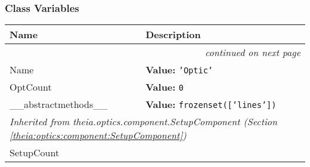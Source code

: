 
  \subsubsection{Class Variables}

    \vspace{-1cm}
\hspace{\varindent}\begin{longtable}{|p{\varnamewidth}|p{\vardescrwidth}|l}
\cline{1-2}
\cline{1-2} \centering \textbf{Name} & \centering \textbf{Description}& \\
\cline{1-2}
\endhead\cline{1-2}\multicolumn{3}{r}{\small\textit{continued on next page}}\\\endfoot\cline{1-2}
\endlastfoot\raggedright N\-a\-m\-e\- & \raggedright \textbf{Value:} 
{\tt \texttt{'}\texttt{Optic}\texttt{'}}&\\
\cline{1-2}
\raggedright O\-p\-t\-C\-o\-u\-n\-t\- & \raggedright \textbf{Value:} 
{\tt 0}&\\
\cline{1-2}
\raggedright \_\-\_\-a\-b\-s\-t\-r\-a\-c\-t\-m\-e\-t\-h\-o\-d\-s\-\_\-\_\- & \raggedright \textbf{Value:} 
{\tt \texttt{frozenset([}\texttt{'}\texttt{lines}\texttt{'}\texttt{])}}&\\
\cline{1-2}
\multicolumn{2}{|l|}{\textit{Inherited from theia.optics.component.SetupComponent \textit{(Section \ref{theia:optics:component:SetupComponent})}}}\\
\multicolumn{2}{|p{\varwidth}|}{\raggedright SetupCount}\\
\cline{1-2}
\end{longtable}

